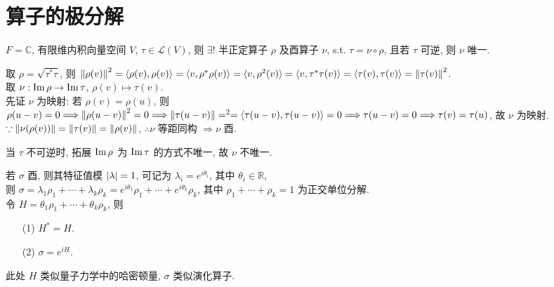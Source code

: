 \documentclass{note}
\begin{document}
\section{算子的极分解}
\begin{thm}
    $F=\mathbb{C}$, 有限维内积向量空间 $V$, $\tau\in\mathcal{L}(V)$, 则 $\exists!$ 半正定算子 $\rho$ 及酉算子 $\nu$, s.t. $\tau=\nu\circ\rho$, 且若 $\tau$ 可逆, 则 $\nu$ 唯一.
\end{thm}
\begin{pf}
    \begin{itemize}
        取 $\rho=\sqrt{\tau^*\tau}$, 则 $\left\lVert\rho(v)\right\rVert^2=\langle\rho(v),\rho(v)\rangle=\langle v,\rho^*\rho(v)\rangle=\langle v,\rho^2(v)\rangle=\langle v,\tau^*\tau(v)\rangle=\langle\tau(v),\tau(v)\rangle=\left\lVert\tau(v)\right\rVert^2$.\\
        取 $\nu:\operatorname{Im}\rho\rightarrow\operatorname{Im}\tau$, $\rho(v)\mapsto\tau(v)$.\\
        先证 $\nu$ 为映射: 若 $\rho(v)=\rho(u)$, 则 $\rho(u-v)=0\Longrightarrow\left\lVert\rho(u-v)\right\rVert^2=0\Longrightarrow\left\lVert\tau(u-v)\right\rVert=^2=\langle\tau(u-v),\tau(u-v)\rangle=0\Longrightarrow\tau(u-v)=0\Longrightarrow\tau(v)=\tau(u)$, 故 $\nu$ 为映射.\\
        $\because\left\lVert\nu(\rho(v))\right\rVert=\left\lVert\tau(v)\right\rVert=\left\lVert\rho(v)\right\rVert$, $\therefore\nu$ 等距同构 $\Longrightarrow\nu$ 酉.

        当 $\tau$ 不可逆时, 拓展 $\operatorname{Im}\rho$ 为 $\operatorname{Im}\tau$ 的方式不唯一, 故 $\nu$ 不唯一.
    \end{itemize}
\end{pf}

若 $\sigma$ 酉, 则其特征值模 $\left\lvert\lambda\right\rvert=1$, 可记为 $\lambda_i=e^{i\theta_i}$, 其中 $\theta_i\in\mathbb{R}$,\\
则 $\sigma=\lambda_1\rho_1+\cdots+\lambda_k\rho_k=e^{i\theta_1}\rho_1+\cdots+e^{i\theta_k}\rho_k$, 其中 $\rho_1+\cdots+\rho_k=1$ 为正交单位分解.\\
令 $H=\theta_1\rho_1+\cdots+\theta_k\rho_k$, 则
\begin{itemize}
    \item[(1)] $H^*=H$.
    \item[(2)] $\sigma=e^{iH}$.
\end{itemize}
此处 $H$ 类似量子力学中的哈密顿量, $\sigma$ 类似演化算子.
\ifx\allfiles\undefined
\end{document}
